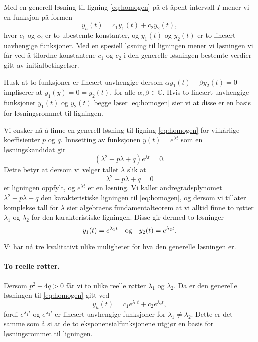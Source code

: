 \documentclass{article}
\theoremstyle{definition}
\newenvironment{defn}
{\pushQED{\qed}\renewcommand{\qedsymbol}{$\triangle$}\defnx}
{\popQED\enddefnx}
\theoremstyle{remark}
\begin{document}
\begin{multicols*}{2}
\begin{defn}
    Med en generell løsning til ligning \eqref{eq:homogen} på et åpent intervall $I$ mener vi en funksjon på formen
    \begin{equation*}
      y_h(t) = c_1 y_1(t) + c_2 y_2(t),
    \end{equation*}
    hvor $c_1$ og $c_2$ er to ubestemte konstanter, og $y_1(t)$ og $y_2(t)$ er to lineært uavhengige funksjoner. Med en spesiell løsning til ligningen mener vi løsningen vi får ved å tilordne konstantene $c_1$ og $c_2$ i den generelle løsningen bestemte verdier gitt av initialbetingelser.
\end{defn}

Husk at to funksjoner er lineært uavhengige dersom $\alpha y_1(t) + \beta y_2(t) = 0$ impliserer at $y_1(y) = 0 = y_2(t)$, for alle $\alpha, \beta \in \mathbb{C}$. Hvis to lineært uavhengige funksjoner $y_1(t)$ og $y_2(t)$ begge løser \eqref{eq:homogen} sier vi at disse er en basis for løsningsrommet til ligningen.

Vi ønsker nå å finne en generell løsning til ligning \eqref{eq:homogen} for vilkårlige koeffisienter $p$ og $q$. Innsetting av funksjonen $y(t) = e^{\lambda t}$ som en løsningskandidat gir
\begin{equation*}
  (\lambda^2 + p \lambda + q) e^{\lambda t} = 0.
\end{equation*}
Dette betyr at dersom vi velger tallet $\lambda$ slik at
\begin{equation*}
  \lambda^2 + p \lambda + q = 0  
\end{equation*}
er ligningen oppfylt, og $e^{\lambda t}$ er en løsning. Vi kaller andregradsplynomet $\lambda^2 + p \lambda + q$ den karakteristiske ligningen til \eqref{eq:homogen}, og dersom vi tillater komplekse tall for $\lambda$ sier algebraens fundamentalteorem at vi alltid finne to røtter $\lambda_1$ og $\lambda_2$ for den karakteristiske ligningen. Disse gir dermed to løsninger
\begin{equation*}
  y_1(t) = e^{\lambda_1 t}\ \ \textnormal{ og }\ \ y_2(t) = e^{\lambda_2 t}.
\end{equation*}

Vi har nå tre kvalitativt ulike muligheter for hva den generelle løsningen er.

\paragraph*{To reelle røtter.} Dersom $p^2 - 4q > 0$ får vi to ulike reelle røtter $\lambda_1$ og $\lambda_2$. Da er den generelle løsningen til \eqref{eq:homogen} gitt ved
\begin{equation*}
  y_h(t) = c_1 e^{\lambda_1 t} + c_2 e^{\lambda_2 t},
\end{equation*}
fordi $e^{\lambda_1 t}$ og $e^{\lambda_2 t}$ er lineært uavhengige funksjoner for $\lambda_1 \neq \lambda_2$. Dette er det samme som å si at de to eksponensialfunksjonene utgjør en basis for løsningsrommet til ligningen.


\end{multicols*}
\end{document}

